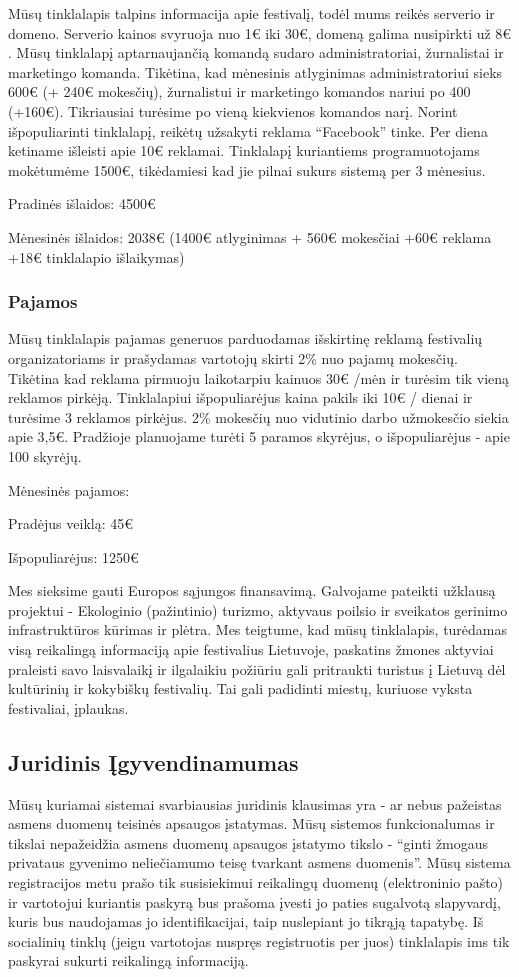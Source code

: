 \documentclass{VUMIFPSkursinis}
\begin{document}
Mūsų tinklalapis talpins informacija apie festivalį, todėl mums reikės serverio ir domeno. Serverio kainos svyruoja nuo 1€ iki 30€, domeną galima nusipirkti už 8€ .
Mūsų tinklalapį aptarnaujančią komandą sudaro administratoriai, žurnalistai ir marketingo komanda. Tikėtina, kad mėnesinis atlyginimas administratoriui sieks 600€ (+ 240€ mokesčių),  žurnalistui ir marketingo komandos nariui po 400 (+160€). Tikriausiai turėsime po vieną kiekvienos komandos narį.  Norint išpopuliarinti tinklalapį, reikėtų užsakyti reklama “Facebook” tinke. Per diena ketiname išleisti apie 10€ reklamai. Tinklalapį kuriantiems programuotojams mokėtumėme 1500€, tikėdamiesi kad jie pilnai sukurs sistemą per 3 mėnesius.
 
Pradinės išlaidos: 4500€
 
Mėnesinės išlaidos: 2038€ (1400€ atlyginimas + 560€ mokesčiai +60€ reklama +18€ tinklalapio išlaikymas)
 
\subsubsection{Pajamos}
 
Mūsų tinklalapis pajamas generuos parduodamas išskirtinę reklamą festivalių organizatoriams ir prašydamas vartotojų skirti 2\% nuo pajamų mokesčių. Tikėtina kad reklama pirmuoju laikotarpiu kainuos 30€ /mėn ir turėsim tik vieną reklamos pirkėją. Tinklalapiui išpopuliarėjus kaina pakils iki 10€ / dienai ir turėsime 3 reklamos pirkėjus. 2\% mokesčių nuo vidutinio darbo užmokesčio siekia apie 3,5€. Pradžioje planuojame turėti 5 paramos skyrėjus, o išpopuliarėjus - apie 100 skyrėjų.
 
Mėnesinės pajamos:
 
Pradėjus veiklą: 45€
 
Išpopuliarėjus: 1250€
 
Mes sieksime gauti Europos sąjungos finansavimą. Galvojame pateikti užklausą projektui - Ekologinio (pažintinio) turizmo, aktyvaus poilsio ir sveikatos gerinimo infrastruktūros kūrimas ir plėtra. Mes teigtume, kad mūsų tinklalapis, turėdamas visą reikalingą informaciją apie festivalius Lietuvoje, paskatins žmones aktyviai praleisti savo laisvalaikį ir ilgalaikiu požiūriu gali pritraukti turistus į Lietuvą dėl kultūrinių ir kokybiškų festivalių. Tai gali padidinti miestų, kuriuose vyksta festivaliai, įplaukas.
\subsection{Juridinis Įgyvendinamumas}
 Mūsų kuriamai sistemai svarbiausias juridinis klausimas yra - ar nebus pažeistas asmens duomenų teisinės apsaugos įstatymas. Mūsų sistemos funkcionalumas ir tikslai nepažeidžia asmens duomenų apsaugos įstatymo tikslo - “ginti žmogaus privataus gyvenimo neliečiamumo teisę tvarkant asmens duomenis”. Mūsų sistema registracijos metu prašo tik susisiekimui reikalingų duomenų (elektroninio pašto) ir vartotojui kuriantis paskyrą bus prašoma įvesti jo paties sugalvotą slapyvardį, kuris bus naudojamas jo identifikacijai, taip nuslepiant jo tikrąją tapatybę. Iš socialinių tinklų (jeigu vartotojas nuspręs registruotis per juos) tinklalapis ims tik paskyrai sukurti reikalingą informaciją.
\end{document}
